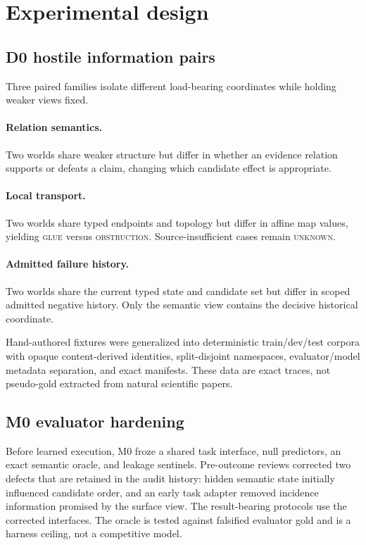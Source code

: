 \section{Experimental design}

\subsection{D0 hostile information pairs}

Three paired families isolate different load-bearing coordinates while holding weaker views fixed.

\paragraph{Relation semantics.}
Two worlds share weaker structure but differ in whether an evidence relation supports or defeats a claim, changing which candidate effect is appropriate.

\paragraph{Local transport.}
Two worlds share typed endpoints and topology but differ in affine map values, yielding \textsc{glue} versus \textsc{obstruction}. Source-insufficient cases remain \textsc{unknown}.

\paragraph{Admitted failure history.}
Two worlds share the current typed state and candidate set but differ in scoped admitted negative history. Only the semantic view contains the decisive historical coordinate.

Hand-authored fixtures were generalized into deterministic train/dev/test corpora with opaque content-derived identities, split-disjoint namespaces, evaluator/model metadata separation, and exact manifests. These data are exact traces, not pseudo-gold extracted from natural scientific papers.

\subsection{M0 evaluator hardening}

Before learned execution, M0 froze a shared task interface, null predictors, an exact semantic oracle, and leakage sentinels. Pre-outcome reviews corrected two defects that are retained in the audit history: hidden semantic state initially influenced candidate order, and an early task adapter removed incidence information promised by the surface view. The result-bearing protocols use the corrected interfaces. The oracle is tested against falsified evaluator gold and is a harness ceiling, not a competitive model.

